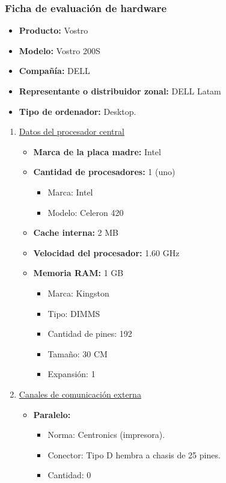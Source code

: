\subsubsection{Ficha de evaluación de hardware}
\begin{itemize}
  \item \textbf{Producto:} Vostro
  \item \textbf{Modelo:} Vostro 200S
  \item \textbf{Compañía:} DELL
  \item \textbf{Representante o distribuidor zonal:} DELL Latam
  \item \textbf{Tipo de ordenador:} Desktop.
\end{itemize}

\begin{enumerate}

  \item \underline{Datos del procesador central}
  \begin{itemize}
    \item \textbf{Marca de la placa madre:} Intel
    
    \item \textbf{Cantidad de procesadores:} 1 (uno)
    \begin{itemize}
      \item Marca: Intel
      \item Modelo: Celeron 420
    \end{itemize}
    
    \item \textbf{Cache interna:} 2 MB
    \item \textbf{Velocidad del procesador:} 1.60 GHz
    \item \textbf{Memoria RAM:} 1 GB
    
    \begin{itemize}
      \item Marca: Kingston
      \item Tipo: DIMMS 
      \item Cantidad de pines: 192
      \item Tamaño: 30 CM 
      \item Expansión: 1
    \end{itemize}
  \end{itemize}
  
  
  \item \underline{Canales de comunicación externa}
  \begin{itemize}
    \item \textbf{Paralelo:}
    \begin{itemize}
      \item Norma: Centronics (impresora).
      \item Conector: Tipo D hembra a chasis de 25 pines.
      \item Cantidad: 0
    \end{itemize}
    

\end{itemize}
\end{enumerate}
